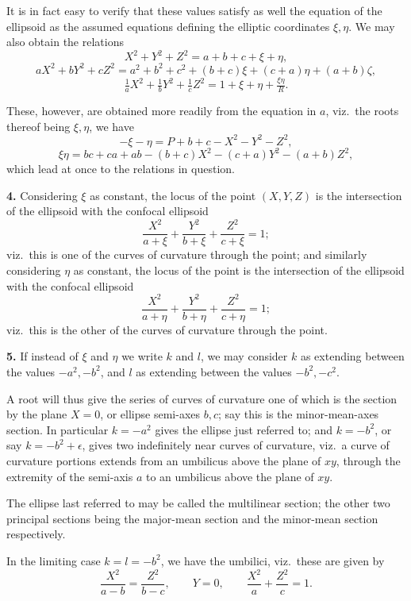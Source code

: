 \documentclass[11pt,a4paper]{book}
\begin{document}
It is in fact easy to verify that these values satisfy as well the equation of the ellipsoid as the assumed equations defining the elliptic coordinates $\xi, \eta$. We may also obtain the relations
\[
X^2 + Y^2 + Z^2 = a + b + c + \xi + \eta,
\]
\[
aX^2 + bY^2 + cZ^2 = a^2 + b^2 + c^2 + (b + c)\xi + (c + a)\eta + (a + b)\zeta,
\]
\[
\tfrac{1}{a}X^2 + \tfrac{1}{b}Y^2 + \tfrac{1}{c}Z^2 = 1 + \xi + \eta + \tfrac{\xi\eta}{R}.
\]

These, however, are obtained more readily from the equation in $a$, viz.\ the roots thereof being $\xi, \eta$, we have
\[
-\xi - \eta = P + b + c - X^2 - Y^2 - Z^2,
\]
\[
\xi\eta = bc + ca + ab - (b + c)X^2 - (c + a)Y^2 - (a + b)Z^2,
\]
which lead at once to the relations in question.

\textbf{4.} Considering $\xi$ as constant, the locus of the point $(X, Y, Z)$ is the intersection of the ellipsoid with the confocal ellipsoid
\[
\frac{X^2}{a + \xi} + \frac{Y^2}{b + \xi} + \frac{Z^2}{c + \xi} = 1;
\]
viz.\ this is one of the curves of curvature through the point; and similarly considering $\eta$ as constant, the locus of the point is the intersection of the ellipsoid with the confocal ellipsoid
\[
\frac{X^2}{a + \eta} + \frac{Y^2}{b + \eta} + \frac{Z^2}{c + \eta} = 1;
\]
viz.\ this is the other of the curves of curvature through the point.

\textbf{5.} If instead of $\xi$ and $\eta$ we write $k$ and $l$, we may consider $k$ as extending between the values $-a^2, -b^2$, and $l$ as extending between the values $-b^2, -c^2$.

A root will thus give the series of curves of curvature one of which is the section by the plane $X = 0$, or ellipse semi-axes $b, c$; say this is the minor-mean-axes section. In particular $k = -a^2$ gives the ellipse just referred to; and $k = -b^2$, or say $k = -b^2 + \epsilon$, gives two indefinitely near curves of curvature, viz.\ a curve of curvature portions extends from an umbilicus above the plane of $xy$, through the extremity of the semi-axis $a$ to an umbilicus above the plane of $xy$.

The ellipse last referred to may be called the multilinear section; the other two principal sections being the major-mean section and the minor-mean section respectively.

In the limiting case $k = l = -b^2$, we have the umbilici, viz.\ these are given by
\[
\frac{X^2}{a - b} = \frac{Z^2}{b - c},\qquad Y = 0,\qquad \frac{X^2}{a} + \frac{Z^2}{c} = 1.
\]
\end{document}
